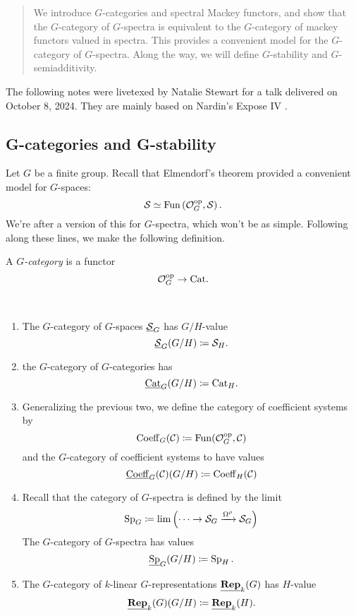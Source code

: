 \documentclass{amsart}
\begin{document}
\begin{abstract}
  We introduce $G$-categories and spectral Mackey functors, and show that the $G$-category of $G$-spectra is equivalent to the $G$-category of mackey functors valued in spectra. This provides a convenient model for the $G$-category of $G$-spectra. Along the way, we will define $G$-stability and $G$-semiadditivity.
\end{abstract}

The following notes were livetexed by Natalie Stewart for a talk delivered on October 8, 2024.
They are mainly based on Nardin's Expose IV \cite{Nardin}.

\subsection{G-categories and G-stability}
Let $G$ be a finite group.
Recall that Elmendorf's theorem provided a convenient model for $G$-spaces:
\[
  \mathcal{S} \simeq \operatorname{Fun}\left( \mathcal{O}_G^{\operatorname{op}},\mathcal{S} \right).
\]
We're after a version of this for $G$-spectra, which won't be as simple.
Following along these lines, we make the following definition.
\begin{definition}
  A \emph{$G$-category} is a functor
  \[
    \mathcal{O}_G^{\operatorname{op}} \rightarrow \mathrm{Cat}.
  \]
\end{definition}
\begin{example}\,
  \begin{enumerate}
    \item The $G$-category of $G$-spaces $\underline{\mathcal{S}}_G$ has $G/H$-value
    \[
      \underline{\mathcal{S}}_G(G/H) \coloneqq \mathcal{S}_H.
    \]
    \item the $G$-category of $G$-categories has
      \[
        \underline{\mathrm{Cat}}_G(G/H) \coloneqq \mathrm{Cat}_H.
      \]
    \item Generalizing the previous two, we define the category of coefficient systems by 
      \[
        \operatorname{Coeff}_G(\mathcal{C}) \coloneqq \operatorname{Fun}(\mathcal{O}_G^{\operatorname{op}},\mathcal{C})
      \]  
      and the $G$-category of coefficient systems to have values
      \[
        \underline{\operatorname{Coeff}}_G(\mathcal{C})(G/H) \coloneqq \operatorname{Coeff}_H(\mathcal{C})
      \]
    \item Recall that the category of $G$-spectra is defined by the limit
      \[
        \operatorname{Sp}_G \coloneqq \lim \left( \cdots \rightarrow \mathcal{S}_G \xrightarrow{\Omega^\rho} \mathcal{S}_G \right)
      \]
      The $G$-category of $G$-spectra has values
      \[
        \underline{\operatorname{Sp}}_G(G/H) \coloneqq \operatorname{Sp}_H.
      \]
    \item The $G$-category of $k$-linear $G$-representations $\underline{\mathbf{Rep}}_k(G)$ has $H$-value
      \[
        \underline{\mathbf{Rep}}_k(G)(G/H) \coloneqq \underline{\mathbf{Rep}}_k(H).
      \]
  \end{enumerate}
\end{example}
\end{document}
